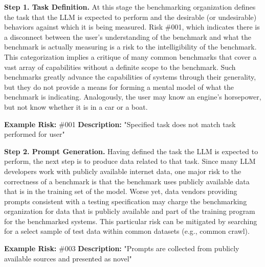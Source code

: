 \documentclass{article}
\begin{document}
{\bf Step 1. Task Definition.} At this stage the benchmarking organization defines the task that the LLM is expected to perform and the desirable (or undesirable) behaviors against which it is being measured. Risk \#001, which indicates there is a disconnect between the user's understanding of the benchmark and what the benchmark is actually measuring is a risk to the intelligibility of the benchmark. This categorization implies a critique of many common benchmarks that cover a vast array of capabilities without a definite scope to the benchmark. Such benchmarks greatly advance the capabilities of systems through their generality, but they do not provide a means for forming a mental model of what the benchmark is indicating. Analogously, the user may know an engine's horsepower, but not know whether it is in a car or a boat.

\begin{center}
    \begin{tcolorbox}[colback=gray!10, colframe=black!50, width=\textwidth, boxrule=0.5mm, sharp corners, coltext=black]
        {\bf Example Risk:} \#001
        \newline
        {\bf Description:} "Specified task does not match task performed for user"
    \end{tcolorbox}
\end{center}

{\bf Step 2. Prompt Generation.} Having defined the task the LLM is expected to perform, the next step is to produce data related to that task. Since many LLM developers work with publicly available internet data, one major risk to the correctness of a benchmark is that the benchmark uses publicly available data that is in the training set of the model. Worse yet, data vendors providing prompts consistent with a testing specification may charge the benchmarking organization for data that is publicly available and part of the training program for the benchmarked systems. This particular risk can be mitigated by searching for a select sample of test data within common datasets (e.g., common crawl).

\begin{center}
    \begin{tcolorbox}[colback=gray!10, colframe=black!50, width=\textwidth, boxrule=0.5mm, sharp corners, coltext=black]
        {\bf Example Risk:} \#003
        \newline
        {\bf Description:} "Prompts are collected from publicly available sources and presented as novel"
    \end{tcolorbox}
\end{center}
\end{document}
